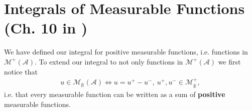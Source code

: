 \section{Integrals of Measurable Functions \protect\\ (Ch. 10 in \cite{schilling2017measures})}
We have defined our integral for positive measurable functions, i.e. functions in \(\mathcal{M}^{+}(\mathscr{A})\). To extend our integral
to not only functions in \(\mathcal{M}^{+}(\mathscr{A})\) we first notice that
\begin{align*}
    u \in \mathcal{M}_{\overline{\mathbb{R}}}(\mathscr{A}) \Leftrightarrow 
    u = u^+ - u^-, \ u^+, u^-\in \mathcal{M}^{+}_{\overline{\mathbb{R}}},
\end{align*}
i.e. that every measurable function can be written as a sum of \textbf{positive} measurable functions.

